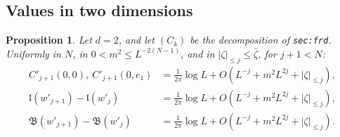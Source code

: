 \documentclass[11pt]{amsart}
\newtheorem{proposition}[theorem]{Proposition}
\theoremstyle{definition}
\theoremstyle{remark}
\numberwithin{equation}{section}
\begin{document}
\subsection{Values in two dimensions}
\label{sec:pt-d2}

\begin{proposition}\label{prop:d2}
Let $d=2$, and let $(C_k)$ be the decomposition of \texttt{sec:frd}. Uniformly in $N$, in
$0<m^2\le L^{-2(N-1)}$, and in $|\zeta|_{\le j}\le\bar\zeta$, for $j+1<N$:
\begin{align*}
  C'_{j+1}(0,0),\ C'_{j+1}(0,e_1)&=\tfrac1{2\pi}\log L+O(L^{-j}+m^2L^{2j}+|\zeta|_{\le j}),\\
  \mathfrak l(w'_{j+1})-\mathfrak l(w'_j)&=\tfrac1{2\pi}\log L+O(L^{-j}+m^2L^{2j}+|\zeta|_{\le j}),\\
  \mathfrak B(w'_{j+1})-\mathfrak B(w'_j)&=\tfrac1{2\pi}\log L+O(L^{-j}+m^2L^{2j}+|\zeta|_{\le j}).
\end{align*}
\end{proposition}
\end{document}
